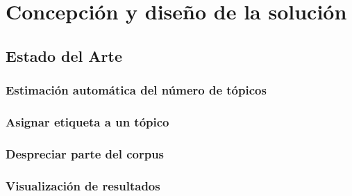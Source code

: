 \chapter{Concepción y dise\~no de la solución}\label{chapter:proposal}

\section{Estado del Arte}

\subsection{Estimaci\'on autom\'atica del n\'umero de t\'opicos}

\subsection{Asignar etiqueta a un t\'opico}

\subsection{Despreciar parte del corpus}

\subsection{Visualizaci\'on de resultados}